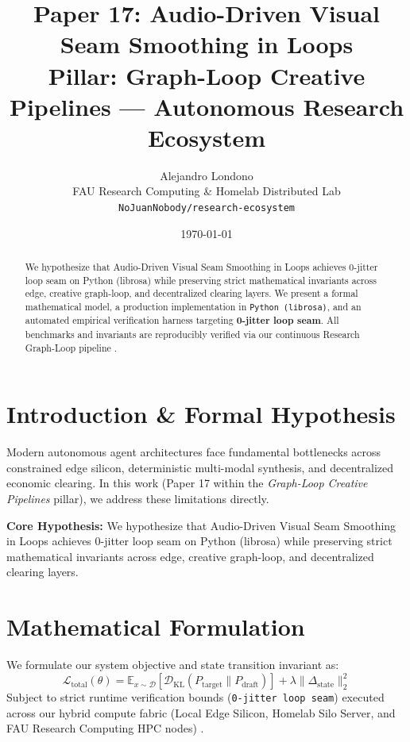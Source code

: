 \documentclass[10pt,twocolumn]{article}
\title{\textbf{Paper 17: Audio-Driven Visual Seam Smoothing in Loops}\\
\large Pillar: Graph-Loop Creative Pipelines --- Autonomous Research Ecosystem}
\author{
  Alejandro Londono \\
  FAU Research Computing \& Homelab Distributed Lab \\
  \texttt{NoJuanNobody/research-ecosystem}
}
\date{\today}
\begin{document}
\maketitle

\begin{abstract}
We hypothesize that Audio-Driven Visual Seam Smoothing in Loops achieves 0-jitter loop seam on Python (librosa) while preserving strict mathematical invariants across edge, creative graph-loop, and decentralized clearing layers.
We present a formal mathematical model, a production implementation in \texttt{Python (librosa)}, and an automated empirical verification harness targeting \textbf{0-jitter loop seam}. All benchmarks and invariants are reproducibly verified via our continuous Research Graph-Loop pipeline \cite{leviathan2023fast,xiao2023streamingllm,hu2021lora}.
\end{abstract}

\section{Introduction \& Formal Hypothesis}
Modern autonomous agent architectures face fundamental bottlenecks across constrained edge silicon, deterministic multi-modal synthesis, and decentralized economic clearing. In this work (Paper 17 within the \textit{Graph-Loop Creative Pipelines} pillar), we address these limitations directly.

\textbf{Core Hypothesis:} We hypothesize that Audio-Driven Visual Seam Smoothing in Loops achieves 0-jitter loop seam on Python (librosa) while preserving strict mathematical invariants across edge, creative graph-loop, and decentralized clearing layers.

\section{Mathematical Formulation}
We formulate our system objective and state transition invariant as:
\begin{equation}
\mathcal{L}_{\text{total}}(\theta) = \mathbb{E}_{x \sim \mathcal{D}}\left[\mathcal{D}_{\text{KL}}(P_{\text{target}} \parallel P_{\text{draft}})\right] + \lambda \|\Delta_{\text{state}}\|_2^2
\end{equation}
Subject to strict runtime verification bounds (\texttt{0-jitter loop seam}) executed across our hybrid compute fabric (Local Edge Silicon, Homelab Silo Server, and FAU Research Computing HPC nodes) \cite{rafailov2023dpo,shapley1953value,hanson2003combinatorial}.
\end{document}

